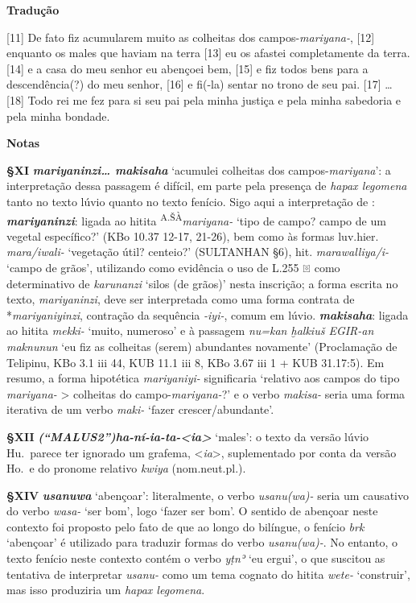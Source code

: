 \bigskip%
\noindent\textbf{Tradução}

[11] De fato fiz acumularem muito as colheitas dos campos-\emph{mariyana-}, [12]
enquanto os males que haviam na terra [13] eu os afastei completamente da terra.
	[14] e a casa do meu senhor eu abençoei bem, [15] e fiz todos bens para a
descendência{(?)} do meu senhor, [16] e fi{(-la)} sentar no trono de seu pai. [17]
\ldots{} [18] Todo rei me fez para si seu pai pela minha justiça e pela minha
sabedoria e pela minha bondade.

\bigskip
\noindent\textbf{Notas}

\smallskip
\noindent\textbf{§XI}\tabto{2em}
\textbf{\emph{mariyaninzi\ldots{} makisaha}} `acumulei
colheitas dos campos-\emph{mariyana}': a interpretação dessa passagem
é difícil, em parte pela presença de \emph{hapax legomena} tanto no texto lúvio
quanto no texto fenício.
Sigo aqui a interpretação de \citet{VanDenHout2010}:
\textbf{\emph{mariyaninzi}}: ligada ao hitita
\textsuperscript{A.ŠÀ}\emph{mariyana-} `tipo de
campo? campo de um vegetal específico?' (KBo 10.37 12-17, 21-26), bem como às
formas luv.hier. \emph{mara/iwali-} `vegetação útil? centeio?' (SULTANHAN §6),
hit. \emph{marawalliya/i-} `campo de grãos', utilizando como evidência o uso de
L.255 𔔡 como determinativo de \emph{karunanzi} `silos (de grãos)' nesta
inscrição;
a forma escrita no texto, \emph{mariyaninzi}, deve ser interpretada como uma
forma contrata de *\emph{mariyaniyinzi}, contração da sequência \emph{-iyi-},
comum em lúvio.
\textbf{\emph{makisaha}}: ligada ao hitita \emph{mekki-} `muito, numeroso' e à
passagem \emph{nu=kan ḫalkiuš EGIR-an maknunun} `eu fiz as colheitas (serem)
abundantes novamente' (Proclamação de Telipinu, KBo 3.1 iii 44, KUB 11.1 iii 8,
KBo 3.67 iii 1 + KUB 31.17:5).
Em resumo, a forma hipotética \emph{mariyaniyi-} significaria `relativo aos
campos do tipo \emph{mariyana-} > colheitas do campo-\emph{mariyana-}?' e o
verbo \emph{makisa-} seria uma forma iterativa de um verbo \emph{maki-} `fazer
crescer/abundante'.


\smallskip
\noindent\textbf{§XII}\tabto{2em}
\textbf{\emph{\emph{(“MALUS2”)}ha-ní-ia-ta-<ia>}} `males': o texto da versão
lúvio Hu.\ parece ter ignorado um grafema, <\emph{ia}>, suplementado por conta
da versão Ho.\ e do pronome relativo \emph{kwiya} (nom.neut.pl.).

\smallskip
\noindent\textbf{§XIV}\tabto{2em}
\textbf{\emph{usanuwa}} `abençoar': literalmente, o verbo \emph{usanu{(wa)}-}
seria um causativo do verbo \emph{wasa-} `ser bom', logo `fazer ser
bom'. O sentido de abençoar neste contexto foi proposto pelo fato de que ao
longo do bilíngue, o fenício \emph{brk} `abençoar' é utilizado para traduzir
formas do verbo \emph{usanu{(wa)}-}.
No entanto, o texto fenício neste contexto contém o verbo \emph{yṭnʾ} `eu
ergui', o que suscitou as tentativa de interpretar \emph{usanu-} como um tema
cognato do hitita \emph{wete-} `construir', mas isso produziria um \emph{hapax
	legomena}.

